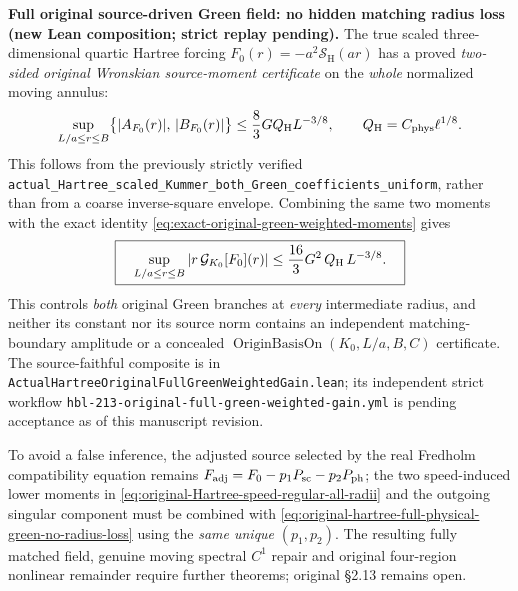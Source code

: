 \documentclass[11pt]{amsart}
\begin{document}
\medskip
\noindent\textbf{Full original source-driven Green field: no hidden matching
radius loss (new Lean composition; strict replay pending).}
The true scaled three-dimensional quartic Hartree forcing
$F_0(r)=-a^2\mathcal S_{\mathrm H}(ar)$ has a proved
\emph{two-sided original Wronskian source-moment certificate}
on the \emph{whole} normalized moving annulus:
\[
 \sup_{L/a\le r\le B}
 \bigl\{\lvert A_{F_0}(r)\rvert,\,
       \lvert B_{F_0}(r)\rvert\bigr\}
 \le \frac83 G Q_{\rm H}L^{-3/8},
 \qquad Q_{\rm H}
 =C_{\rm phys}\ell^{1/8}.
\]
This follows from the previously strictly verified
\texttt{actual\_Hartree\_scaled\_Kummer\_both\_Green\_coefficients\_uniform},
rather than from a coarse inverse-square envelope.  Combining the
same two moments with the exact
identity \eqref{eq:exact-original-green-weighted-moments} gives
\begin{equation}
 \boxed{\quad
 \sup_{L/a\le r\le B}
 \left|r\,\mathcal G_{K_0}[F_0](r)\right|
 \le \frac{16}{3}G^2\,Q_{\rm H}\,L^{-3/8}.
 \quad}
 \label{eq:original-hartree-full-physical-green-no-radius-loss}
\end{equation}
This controls \emph{both} original Green branches at \emph{every}
intermediate radius, and neither its constant nor its source norm
contains an independent matching-boundary amplitude or a concealed
$\operatorname{OriginBasisOn}(K_0,L/a,B,C)$ certificate.
The source-faithful composite is in
\texttt{ActualHartreeOriginalFullGreenWeightedGain.lean};
its independent strict workflow
\texttt{hbl-213-original-full-green-weighted-gain.yml}
is pending acceptance as of this manuscript revision.

To avoid a false inference, the adjusted source selected by the
real Fredholm compatibility equation remains
$F_{\rm adj}=F_0-p_1P_{\rm sc}-p_2P_{\rm ph}$;
the two speed-induced lower moments in
\eqref{eq:original-Hartree-speed-regular-all-radii} and the outgoing
singular component must be combined with
\eqref{eq:original-hartree-full-physical-green-no-radius-loss}
using the \emph{same unique} $(p_1,p_2)$.
The resulting fully matched field, genuine moving spectral $C^1$
repair and original four-region nonlinear remainder require further
theorems; original \S2.13 remains open.
\end{document}
